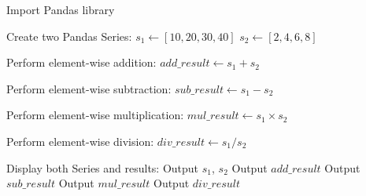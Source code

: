 \begin{algorithm}
\caption{Arithmetic Operations on Two Pandas Series}
\begin{algorithmic}[1]

\STATE Import Pandas library

\STATE Create two Pandas Series:
\STATE $s_1 \gets [10, 20, 30, 40]$
\STATE $s_2 \gets [2, 4, 6, 8]$

\STATE Perform element-wise addition:
\STATE $add\_result \gets s_1 + s_2$

\STATE Perform element-wise subtraction:
\STATE $sub\_result \gets s_1 - s_2$

\STATE Perform element-wise multiplication:
\STATE $mul\_result \gets s_1 \times s_2$

\STATE Perform element-wise division:
\STATE $div\_result \gets s_1 / s_2$

\STATE Display both Series and results:
\STATE Output $s_1$, $s_2$
\STATE Output $add\_result$
\STATE Output $sub\_result$
\STATE Output $mul\_result$
\STATE Output $div\_result$

\end{algorithmic}
\end{algorithm}